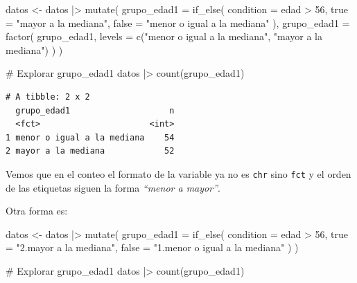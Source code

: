 \documentclass[
  spanish,
  a4paper,
]{scrbook}
\newenvironment{Shaded}{\begin{snugshade}}{\end{snugshade}}
\newcommand{\AttributeTok}[1]{\textcolor[rgb]{0.40,0.45,0.13}{#1}}
\newcommand{\CommentTok}[1]{\textcolor[rgb]{0.37,0.37,0.37}{#1}}
\newcommand{\DecValTok}[1]{\textcolor[rgb]{0.68,0.00,0.00}{#1}}
\newcommand{\FunctionTok}[1]{\textcolor[rgb]{0.28,0.35,0.67}{#1}}
\newcommand{\NormalTok}[1]{\textcolor[rgb]{0.00,0.23,0.31}{#1}}
\newcommand{\OtherTok}[1]{\textcolor[rgb]{0.00,0.23,0.31}{#1}}
\newcommand{\SpecialCharTok}[1]{\textcolor[rgb]{0.37,0.37,0.37}{#1}}
\newcommand{\StringTok}[1]{\textcolor[rgb]{0.13,0.47,0.30}{#1}}
\begin{document}
\begin{Shaded}
\begin{Highlighting}[]
\NormalTok{datos }\OtherTok{\textless{}{-}}\NormalTok{ datos }\SpecialCharTok{|\textgreater{}}
  \FunctionTok{mutate}\NormalTok{(}
    \AttributeTok{grupo\_edad1 =} \FunctionTok{if\_else}\NormalTok{(}
      \AttributeTok{condition =}\NormalTok{ edad }\SpecialCharTok{\textgreater{}} \DecValTok{56}\NormalTok{,}
      \AttributeTok{true =} \StringTok{"mayor a la mediana"}\NormalTok{,}
      \AttributeTok{false =} \StringTok{"menor o igual a la mediana"}
\NormalTok{    ),}
    \AttributeTok{grupo\_edad1 =} \FunctionTok{factor}\NormalTok{(}
\NormalTok{      grupo\_edad1,}
      \AttributeTok{levels =} \FunctionTok{c}\NormalTok{(}\StringTok{"menor o igual a la mediana"}\NormalTok{, }\StringTok{"mayor a la mediana"}\NormalTok{)}
\NormalTok{    )}
\NormalTok{  )}

\CommentTok{\# Explorar grupo\_edad1}
\NormalTok{datos }\SpecialCharTok{|\textgreater{}}
  \FunctionTok{count}\NormalTok{(grupo\_edad1)}
\end{Highlighting}
\end{Shaded}

\begin{verbatim}
# A tibble: 2 x 2
  grupo_edad1                    n
  <fct>                      <int>
1 menor o igual a la mediana    54
2 mayor a la mediana            52
\end{verbatim}

Vemos que en el conteo el formato de la variable ya no es \texttt{chr}
sino \texttt{fct} y el orden de las etiquetas siguen la forma
\emph{``menor a mayor''}.

Otra forma es:

\begin{Shaded}
\begin{Highlighting}[]
\NormalTok{datos }\OtherTok{\textless{}{-}}\NormalTok{ datos }\SpecialCharTok{|\textgreater{}}
  \FunctionTok{mutate}\NormalTok{(}
    \AttributeTok{grupo\_edad1 =} \FunctionTok{if\_else}\NormalTok{(}
      \AttributeTok{condition =}\NormalTok{ edad }\SpecialCharTok{\textgreater{}} \DecValTok{56}\NormalTok{,}
      \AttributeTok{true =} \StringTok{"2.mayor a la mediana"}\NormalTok{,}
      \AttributeTok{false =} \StringTok{"1.menor o igual a la mediana"}
\NormalTok{    )}
\NormalTok{  )}

\CommentTok{\# Explorar grupo\_edad1}
\NormalTok{datos }\SpecialCharTok{|\textgreater{}}
  \FunctionTok{count}\NormalTok{(grupo\_edad1)}
\end{Highlighting}
\end{Shaded}
\end{document}
